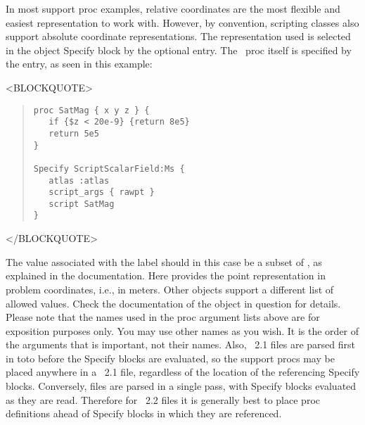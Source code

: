 In most support proc examples, relative coordinates are the most
flexible and easiest representation to work with.  However, by
convention, scripting  classes also support absolute
coordinate representations.  The representation used is selected in the
 object Specify block by the optional 
entry.  The \Tcl\ proc itself is specified by the  entry,
as seen in this example:
\begin{rawhtml}
<BLOCKQUOTE>
\end{rawhtml}
\begin{quote}
\begin{verbatim}
proc SatMag { x y z } {
   if {$z < 20e-9} {return 8e5}
   return 5e5
}

Specify ScriptScalarField:Ms {
   atlas :atlas
   script_args { rawpt }
   script SatMag
}
\end{verbatim}
\end{quote}
\begin{rawhtml}
</BLOCKQUOTE>
\end{rawhtml}
The value associated with the label  should in this
case be a subset of , as explained in the
documentation.  Here
 provides the point representation in problem coordinates,
i.e., in meters.  Other  objects support a different list
of allowed  values.  Check the documentation of the
 object in question for details.  Please note that the
names used in the proc argument lists above are for exposition purposes
only.  You may use other names as you wish.  It is the order of the
arguments that is important, not their names.  Also, \MIF~2.1 files are
parsed first in toto before the Specify blocks are evaluated, so the
support procs may be placed anywhere in a \MIF~2.1 file, regardless of
the location of the referencing Specify blocks.  Conversely,
files are parsed in a single pass, with Specify blocks evaluated as they
are read.  Therefore for \MIF~2.2 files it is generally best to place
proc definitions ahead of Specify blocks in which they are referenced.


